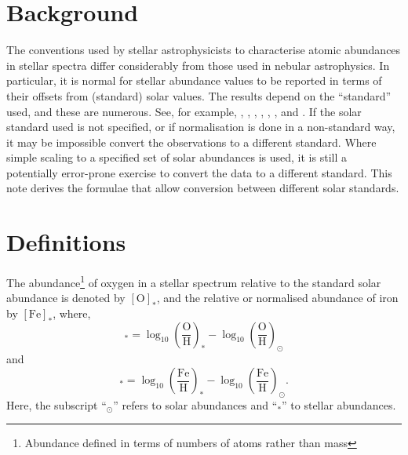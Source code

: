 \section{Background}

The conventions used by stellar astrophysicists to characterise atomic abundances in stellar spectra differ considerably from those used in nebular astrophysics.  In particular, it is normal for stellar abundance values to be reported in terms of their offsets from (standard) solar values. The results depend on the ``standard'' used, and these are numerous. See, for example, \cite{1989GeCoA..53..197A}, \cite{1998SSRv...85..161G}, \cite{2007SSRv..130..105G}, \cite{2009ARA&A..47..481A}, \cite{2010Ap&SS.328..179G}, \cite{2015A&A...573A..25S}, \cite{2015A&A...573A..26S} and \cite{2015A&A...573A..27G}.  If the solar standard used is not specified, or if normalisation is done in a non-standard way, it may be impossible convert the observations to a different standard. Where simple scaling to a specified set of solar abundances is used, it is still a potentially error-prone exercise to convert the data to a different standard. This note derives the formulae that allow conversion between different solar standards.
  
\section{Definitions}
The abundance\footnote{Abundance defined in terms of numbers of atoms rather than mass} of oxygen in a stellar spectrum relative to the standard solar abundance is denoted by $[\text{O}]_*$, and the relative or normalised abundance of iron by $[\text{Fe}]_*$, where,
\begin{equation}
[\text{O}]_* = \log_{10}\left(\frac{\text{O}}{\text{H}}\right)_* - \log_{10}\left(\frac{\text{O}}{\text{H}}\right)_\odot
\end{equation}
and
\begin{equation}
[\text{Fe}]_* = \log_{10}\left(\frac{\text{Fe}}{\text{H}}\right)_* - \log_{10}\left(\frac{\text{Fe}}{\text{H}}\right)_\odot .
\end{equation}
Here, the subscript ``$_\odot$'' refers to solar abundances and ``$_*$'' to stellar abundances.

